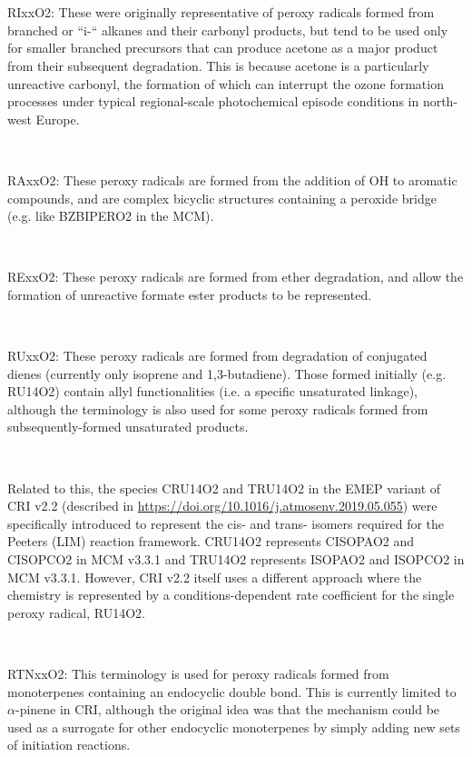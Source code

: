 {{\\}\\ \parbox{\textwidth}{
RIxxO2: These were originally representative of peroxy radicals formed from branched or “i-“ alkanes and their carbonyl products, but tend to be used only for smaller branched precursors that can produce acetone as a major product from their subsequent degradation. This is because acetone is a particularly unreactive carbonyl, the formation of which can interrupt the ozone formation processes under typical regional-scale photochemical episode conditions in north-west Europe.
\\}\\ \parbox{\textwidth}{
RAxxO2: These peroxy radicals are formed from the addition of OH to aromatic compounds, and are complex bicyclic structures containing a peroxide bridge (e.g. like BZBIPERO2 in the MCM).
\\}\\ \parbox{\textwidth}{
RExxO2: These peroxy radicals are formed from ether degradation, and allow the formation of unreactive formate ester products to be represented.
\\}\\ \parbox{\textwidth}{
RUxxO2: These peroxy radicals are formed from degradation of conjugated dienes (currently only isoprene and 1,3-butadiene). Those formed initially (e.g. RU14O2) contain allyl functionalities (i.e. a specific unsaturated linkage), although the terminology is also used for some peroxy radicals formed from subsequently-formed unsaturated products.
\\}\\ \parbox{\textwidth}{
Related to this, the species CRU14O2 and TRU14O2 in the EMEP variant of CRI v2.2 (described in \url{https://doi.org/10.1016/j.atmosenv.2019.05.055}) were specifically introduced to represent the cis- and trans- isomers required for the Peeters (LIM) reaction framework. CRU14O2 represents CISOPAO2 and CISOPCO2 in MCM v3.3.1 and TRU14O2 represents ISOPAO2 and ISOPCO2 in MCM v3.3.1. However, CRI v2.2 itself uses a different approach where the chemistry is represented by a conditions-dependent rate coefficient for the single peroxy radical, RU14O2.
\\}\\ \parbox{\textwidth}{
RTNxxO2: This terminology is used for peroxy radicals formed from monoterpenes containing an endocyclic double bond. This is currently limited to $\alpha$-pinene in CRI, although the original idea was that the mechanism could be used as a surrogate for other endocyclic monoterpenes by simply adding new sets of initiation reactions.
}}
